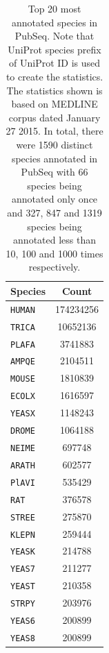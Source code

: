 \begin{table}[htbp]
\caption{Top 20 most annotated species in PubSeq. Note that UniProt species prefix of UniProt ID is used to create the statistics. The statistics shown is based on MEDLINE corpus dated January 27 2015. In total, there were 1590 distinct species annotated in PubSeq with 66 species being annotated only once and 327, 847 and 1319 species being annotated less than 10, 100 and 1000 times respectively.}
\centering
\begin{tabular}{ l c }
  \hline
  Species & Count \\
  \hline
  \hline
  \texttt{HUMAN} & 174234256 \\
  \hline
  \texttt{TRICA} & 10652136 \\
  \hline
  \texttt{PLAFA} & 3741883 \\
  \hline
  \texttt{AMPQE} & 2104511 \\
  \hline
  \texttt{MOUSE} & 1810839 \\
  \hline
  \texttt{ECOLX} & 1616597 \\
  \hline
  \texttt{YEASX} & 1148243 \\
  \hline
  \texttt{DROME} & 1064188 \\
  \hline
  \texttt{NEIME} & 697748 \\
  \hline
  \texttt{ARATH} & 602577 \\
  \hline
  \texttt{PlAVI} & 535429 \\
  \hline
  \texttt{RAT} & 376578 \\
  \hline
  \texttt{STREE} & 275870 \\
  \hline
  \texttt{KLEPN} & 259444 \\
  \hline
  \texttt{YEASK} & 214788 \\
  \hline
  \texttt{YEAS7} & 211277 \\
  \hline
  \texttt{YEAST} & 210358 \\
  \hline
  \texttt{STRPY} & 203976 \\
  \hline
  \texttt{YEAS6} & 200899 \\
  \hline
  \texttt{YEAS8} & 200899 \\
  \hline
\end{tabular}
  \label{tab:AnnotationStats}
\end{table}